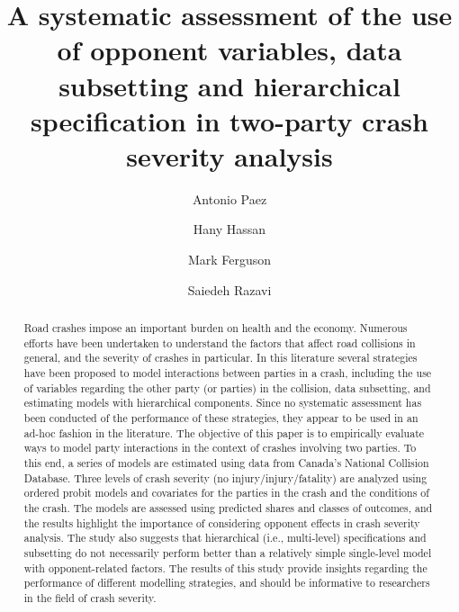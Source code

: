 \documentclass[]{elsarticle} %
\begin{document}
\begin{frontmatter}

  \title{A systematic assessment of the use of opponent variables, data
subsetting and hierarchical specification in two-party crash severity
analysis}
    \author[McMaster University]{Antonio Paez}
    \author[Louisiana State University]{Hany Hassan}
    \author[McMaster University]{Mark Ferguson}
    \author[McMaster University]{Saiedeh Razavi}
      \address[McMaster University]{McMaster Institute for Transportation and Logistics, McMaster
University, 1280 Main Street West, Hamilton, Ontario, Canada L8S 4K1}
    \address[Louisiana State University]{Department of Civil and Environmental Engineering, Louisiana State
University, Baton Rouge, Louisiana, USA 70803}
    
  \begin{abstract}
  Road crashes impose an important burden on health and the economy.
  Numerous efforts have been undertaken to understand the factors that
  affect road collisions in general, and the severity of crashes in
  particular. In this literature several strategies have been proposed to
  model interactions between parties in a crash, including the use of
  variables regarding the other party (or parties) in the collision, data
  subsetting, and estimating models with hierarchical components. Since no
  systematic assessment has been conducted of the performance of these
  strategies, they appear to be used in an ad-hoc fashion in the
  literature. The objective of this paper is to empirically evaluate ways
  to model party interactions in the context of crashes involving two
  parties. To this end, a series of models are estimated using data from
  Canada's National Collision Database. Three levels of crash severity (no
  injury/injury/fatality) are analyzed using ordered probit models and
  covariates for the parties in the crash and the conditions of the crash.
  The models are assessed using predicted shares and classes of outcomes,
  and the results highlight the importance of considering opponent effects
  in crash severity analysis. The study also suggests that hierarchical
  (i.e., multi-level) specifications and subsetting do not necessarily
  perform better than a relatively simple single-level model with
  opponent-related factors. The results of this study provide insights
  regarding the performance of different modelling strategies, and should
  be informative to researchers in the field of crash severity.
  \end{abstract}
  
 \end{frontmatter}
\end{document}
